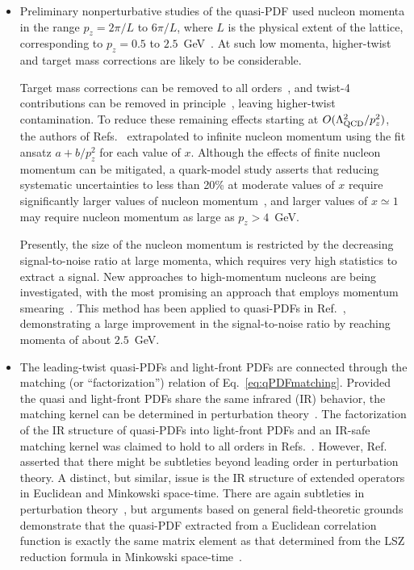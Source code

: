 \begin{itemize}
 \item Preliminary nonperturbative studies of the quasi-PDF used nucleon momenta in the range $p_z = 2\pi/L$ to $6\pi/L$, where $L$ is the physical extent of the lattice, corresponding to $p_z = 0.5$ to $2.5$~GeV~\cite{Lin:2014zya,Alexandrou:2015rja,Chen:2016utp,Alexandrou:2016jqi}. At such low momenta, higher-twist and target mass corrections are likely to be considerable.

Target mass corrections can be removed to all orders~\cite{Chen:2016utp}, and twist-4 contributions can be removed in principle~\cite{Chen:2016utp,Radyushkin:2016hsy}, leaving higher-twist contamination. To reduce these remaining effects starting at $O(\Lambda_{\rm QCD}^2/p_z^2)$, the authors of Refs.~\cite{Lin:2014zya,Chen:2016utp} extrapolated to infinite nucleon momentum using the fit ansatz $a + b/p_z^2$ for each value of $x$. Although the effects of finite nucleon momentum can be mitigated, a quark-model study asserts that reducing systematic uncertainties to less than 20\% at moderate values of $x$ require significantly larger values of nucleon momentum~\cite{Gamberg:2014zwa}, and larger values of $x\simeq 1$ may require nucleon momentum as large as $p_z > 4$~GeV.

Presently, the size of the nucleon momentum is restricted by the decreasing signal-to-noise ratio at large momenta, which requires very high statistics to extract a signal. New approaches to high-momentum nucleons are being investigated, with the most promising an approach that employs momentum smearing~\cite{Bali:2016lva}. This method has been applied to quasi-PDFs in Ref.~\cite{Alexandrou:2016jqi,Green:2017xeu}, demonstrating a large improvement in the signal-to-noise ratio by reaching momenta of about $2.5$~GeV.

\item The leading-twist quasi-PDFs and light-front PDFs are connected through the matching (or ``factorization'') relation of Eq.~\eqref{eq:qPDFmatching}. Provided the quasi and light-front PDFs share the same infrared (IR) behavior, the matching kernel can be determined in perturbation theory~\cite{Xiong:2013bka}. The factorization of the IR structure of quasi-PDFs into light-front PDFs and an IR-safe matching kernel was claimed to hold to all orders in Refs.~\cite{Ma:2014jla, Ma:2014jga,Ma:2017pxb}. However, Ref.~\cite{Li:2016amo} asserted that there might be subtleties beyond leading order in perturbation theory. A distinct, but similar, issue is the IR structure of extended operators in Euclidean and Minkowski space-time. There are again subtleties in perturbation theory~\cite{Carlson:2017gpk}, but arguments based on general field-theoretic grounds demonstrate that the quasi-PDF extracted from a Euclidean correlation function is exactly the same matrix element as that determined from the LSZ reduction formula in Minkowski space-time~\cite{Briceno:2017cpo}.


\end{itemize}
